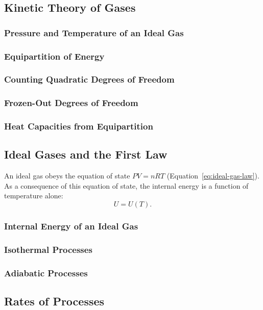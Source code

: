 \documentclass{article}
\begin{document}
\subsection{Kinetic Theory of Gases}
\subsubsection{Pressure and Temperature of an Ideal Gas}
\subsubsection{Equipartition of Energy}
\subsubsection{Counting Quadratic Degrees of Freedom}
\subsubsection{Frozen-Out Degrees of Freedom}
\subsubsection{Heat Capacities from Equipartition}
\subsection{Ideal Gases and the First Law}
An ideal gas obeys the equation of state $PV = nRT$ (Equation~\eqref{eq:ideal-gas-law}). As a consequence of this equation of state, the internal energy is a function of temperature alone:
\begin{equation}
    \label{eq:ideal-gas-internal-energy}
    U = U(T).
\end{equation}

\subsubsection{Internal Energy of an Ideal Gas}
\subsubsection{Isothermal Processes}
\subsubsection{Adiabatic Processes}
\subsection{Rates of Processes}
\end{document}
